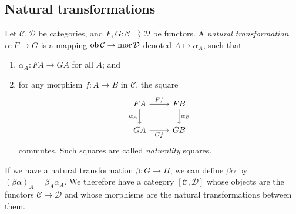 \subsection{Natural transformations}
\begin{definition}
    Let \( \mathcal C, \mathcal D \) be categories, and \( F, G : \mathcal C \rightrightarrows \mathcal D \) be functors.
    A \emph{natural transformation} \( \alpha : F \to G \) is a mapping \( \operatorname{ob} \mathcal C \to \operatorname{mor} \mathcal D \) denoted \( A \mapsto \alpha_A \), such that
    \begin{enumerate}
        \item \( \alpha_A : FA \to GA \) for all \( A \); and
        \item for any morphism \( f : A \to B \) in \( \mathcal C \), the square
        \[\begin{tikzcd}
            FA & FB \\
            GA & GB
            \arrow["Ff", from=1-1, to=1-2]
            \arrow["{\alpha_B}", from=1-2, to=2-2]
            \arrow["{\alpha_A}"', from=1-1, to=2-1]
            \arrow["Gf"', from=2-1, to=2-2]
        \end{tikzcd}\]
        commutes.
        Such squares are called \emph{naturality} squares.
    \end{enumerate}
\end{definition}
If we have a natural transformation \( \beta : G \to H \), we can define \( \beta \alpha \) by \( (\beta \alpha)_A = \beta_A \alpha_A \).
We therefore have a category \( [\mathcal C, \mathcal D] \) whose objects are the functors \( \mathcal C \to \mathcal D \) and whose morphisms are the natural transformations between them.

